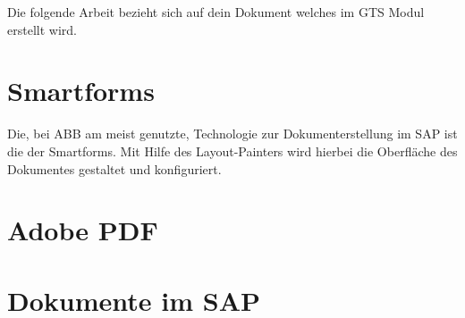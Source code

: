 Die folgende Arbeit bezieht sich auf dein Dokument welches im \ac{GTS} Modul erstellt wird.  




\section{Smartforms}
Die, bei ABB am meist genutzte, Technologie zur Dokumenterstellung im SAP ist die der Smartforms. Mit Hilfe des Layout-Painters wird hierbei die Oberfläche des Dokumentes gestaltet und konfiguriert. 

\section{Adobe PDF}

\section{Dokumente im SAP}